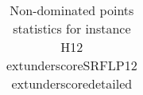 \begin{table}
\caption{Non-dominated points statistics for instance H12	extunderscoreSRFLP12	extunderscoredetailed}
\label{tab:stats/H12_SRFLP12_detailed}
\begin{tabular}{}
\toprule
\midrule
\bottomrule
\end{tabular}
\end{table}
